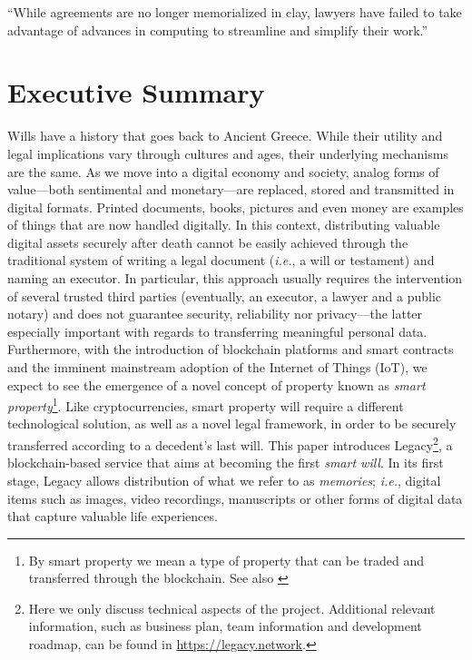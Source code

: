 \begin{savequote}[0.55\linewidth]
	``While agreements are no longer memorialized in clay, lawyers have failed to take advantage of advances in computing to streamline and simplify their work.''
\end{savequote}

\chapter{Executive Summary} %
\label{cha:executive_summary}

Wills have a history that goes back to Ancient Greece. While their utility and legal implications vary through cultures and ages, their underlying mechanisms are the same. As we move into a digital economy and society, analog forms of value---both sentimental and monetary---are replaced, stored and transmitted in digital formats. Printed documents, books, pictures and even money are examples of things that are now handled digitally. In this context, distributing valuable digital assets securely after death cannot be easily achieved through the traditional system of writing a legal document (\textit{i.e.}, a will or testament) and naming an executor. In particular, this approach usually requires the intervention of several trusted third parties (eventually, an executor, a lawyer and a public notary) and does not guarantee security, reliability nor privacy---the latter especially important with regards to transferring meaningful personal data. Furthermore, with the introduction of blockchain platforms and smart contracts and the imminent mainstream adoption of the Internet of Things (IoT), we expect to see the emergence of a novel concept of property known as \textit{smart property}\footnote{By smart property we mean a type of property that can be traded and transferred through the blockchain. See also \cite{smart_prop}}. Like cryptocurrencies, smart property will require a different technological solution, as well as a novel legal framework, in order to be securely transferred according to a decedent's last will.
This paper introduces Legacy\footnote{Here we only discuss technical aspects of the project. Additional relevant information, such as business plan, team information and development roadmap, can be found in \url{https://legacy.network}.}, a blockchain-based service that aims at becoming the first \textit{smart will}. In its first stage, Legacy allows distribution of what we refer to as \textit{memories}; \textit{i.e.}, digital items such as images, video recordings, manuscripts or other forms of digital data that capture valuable life experiences.
